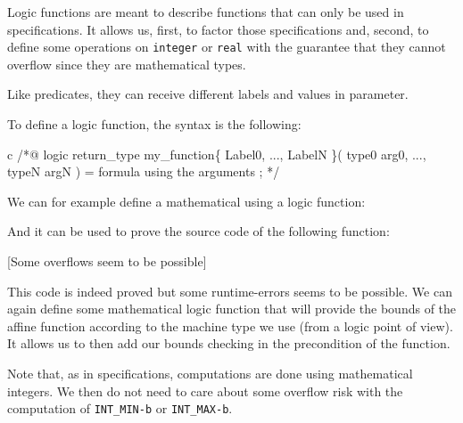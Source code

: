 Logic functions are meant to describe functions that can only be used in
specifications. It allows us, first, to factor those specifications and,
second, to define some operations on \texttt{integer} or \texttt{real}
with the guarantee that they cannot overflow since they are mathematical
types.

Like predicates, they can receive different labels and values in
parameter.





To define a logic function, the syntax is the following:



\begin{CodeBlock}{c}
/*@
  logic return_type my_function\{ Label0, ..., LabelN \}( type0 arg0, ..., typeN argN ) =
    formula using the arguments ;
*/
\end{CodeBlock}



We can for example define a mathematical  using a logic function:






And it can be used to prove the source code of the following function:






[Some overflows seem to be possible]


This code is indeed proved but some runtime-errors seems to be possible.
We can again define some mathematical logic function that will provide the bounds of
the affine function according to the machine type we use (from a logic point of
view). It allows us to then add our bounds checking in the precondition of the
function.






\begin{Information}
  Note that, as in specifications, computations are done using mathematical
  integers. We then do not need to care about some overflow risk with the
  computation of \texttt{INT\_MIN-b} or \texttt{INT\_MAX-b}.
\end{Information}


